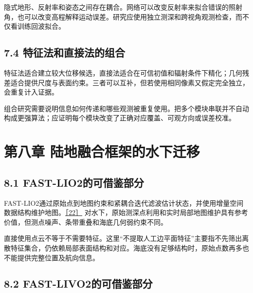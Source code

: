 隐式地形、反射率和姿态之间存在耦合。网络可以改变反射率来拟合错误的照射角，也可以改变高程解释运动误差。研究应使用独立测深和跨视角观测检查，而不仅看训练回波拟合。

\hypertarget{ux7279ux5f81ux6cd5ux548cux76f4ux63a5ux6cd5ux7684ux7ec4ux5408}{%
\subsection{7.4 特征法和直接法的组合}\label{ux7279ux5f81ux6cd5ux548cux76f4ux63a5ux6cd5ux7684ux7ec4ux5408}}

特征法适合建立较大位移候选，直接法适合在可信初值和辐射条件下精化；几何残差适合提供尺度与表面约束。三者可以互补，但若使用相同像素又假定完全独立，会重复计入证据。

组合研究需要说明信息如何传递和哪些观测被重复使用。把多个模块串联并不自动构成更强算法；应证明每个模块改变了正确对应覆盖、可观方向或误差校准。

\hypertarget{ux7b2cux516bux7ae0-ux9646ux5730ux878dux5408ux6846ux67b6ux7684ux6c34ux4e0bux8fc1ux79fb}{%
\section{第八章 陆地融合框架的水下迁移}\label{ux7b2cux516bux7ae0-ux9646ux5730ux878dux5408ux6846ux67b6ux7684ux6c34ux4e0bux8fc1ux79fb}}

\hypertarget{fast-lio2ux7684ux53efux501fux9274ux90e8ux5206}{%
\subsection{8.1 FAST-LIO2的可借鉴部分}\label{fast-lio2ux7684ux53efux501fux9274ux90e8ux5206}}

FAST-LIO2通过原始点到地图约束和紧耦合迭代滤波估计状态，并使用增量空间数据结构维护地图。\href{https://arxiv.org/abs/2107.06829}{［22］} 对水下，原始测深点利用和实时局部地图维护具有参考价值，但测点噪声、条带重叠和海底几何弱约束不同。

直接使用点云不等于不需要特征。这里``不提取人工边平面特征''主要指不先筛出离散特征集合，仍依赖局部表面结构和对应。海底没有足够结构时，原始点数再多也不能提供完整位置及航向信息。

\hypertarget{fast-livo2ux7684ux53efux501fux9274ux90e8ux5206}{%
\subsection{8.2 FAST-LIVO2的可借鉴部分}\label{fast-livo2ux7684ux53efux501fux9274ux90e8ux5206}}

